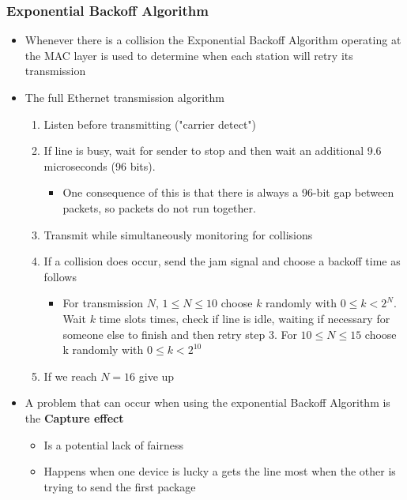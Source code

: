 \documentclass[11pt]{article}
\providecommand{\tightlist}{%
      \setlength{\itemsep}{0pt}\setlength{\parskip}{0pt}}
\begin{document}
    \subsubsection{Exponential Backoff
Algorithm}\label{exponential-backoff-algorithm}

\begin{itemize}
\tightlist
\item
  Whenever there is a collision the Exponential Backoff Algorithm
  operating at the MAC layer is used to determine when each station will
  retry its transmission\\
\item
  The full Ethernet transmission algorithm

  \begin{enumerate}
  \def\labelenumi{\arabic{enumi}.}
  \tightlist
  \item
    Listen before transmitting ("carrier detect")
  \item
    If line is busy, wait for sender to stop and then wait an additional
    9.6 microseconds (96 bits).

    \begin{itemize}
    \tightlist
    \item
      One consequence of this is that there is always a 96-bit gap
      between packets, so packets do not run together.
    \end{itemize}
  \item
    Transmit while simultaneously monitoring for collisions
  \item
    If a collision does occur, send the jam signal and choose a backoff
    time as follows

    \begin{itemize}
    \tightlist
    \item
      For transmission \(N\), \(1\leq N \leq 10\) choose \(k\) randomly
      with \(0 \leq k < 2^N\). Wait \(k\) time slots times, check if
      line is idle, waiting if necessary for someone else to finish and
      then retry step 3. For \(10 \leq N \leq 15\) choose k randomly
      with \(0 \leq k < 2^10\)
    \end{itemize}
  \item
    If we reach \(N = 16\) give up
  \end{enumerate}
\item
  A problem that can occur when using the exponential Backoff Algorithm
  is the \textbf{Capture effect}

  \begin{itemize}
  \tightlist
  \item
    Is a potential lack of fairness
  \item
    Happens when one device is lucky a gets the line most when the other
    is trying to send the first package
  \end{itemize}
\end{itemize}
\end{document}
